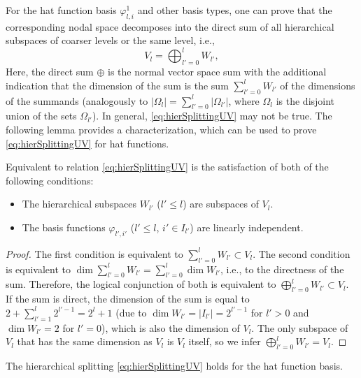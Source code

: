 %
For the hat function basis $\varphi_{l,i}^1$ and other basis types,
one can prove that the corresponding nodal space
decomposes into the direct sum of all
hierarchical subspaces of coarser levels or the same level, i.e.,
\begin{equation}
  \label{eq:hierSplittingUV}
  V_l
  = \bigoplus_{l'=0}^l W_{l'},
\end{equation}
Here, the direct sum $\oplus$ is
the normal vector space sum with the additional indication
that the dimension of the sum is the sum $\sum_{l'=0}^l W_{l'}$
of the dimensions of the summands
(analogously to $|\Omega_l| = \sum_{l'=0}^l |\Omega_{l'}|$,
where $\Omega_l$ is the disjoint union of the sets $\Omega_{l'}$).
In general, \eqref{eq:hierSplittingUV} may not be true.
The following lemma provides a characterization,
which can be used to prove \eqref{eq:hierSplittingUV} for hat functions.
\begin{lemma}
  \label{lemma:hierSplittingUV}
  Equivalent to relation \eqref{eq:hierSplittingUV} is the satisfaction of
  both of the following conditions:
  \begin{itemize}
    \item
    The hierarchical subspaces $W_{l'}$ ($l' \le l$) are subspaces of $V_l$.
    
    \item
    The basis functions $\varphi_{l',i'}$ ($l' \le l$, $i' \in I_{l'}$)
    are linearly independent.
  \end{itemize}
\end{lemma}
\begin{proof}
  The first condition is equivalent to $\sum_{l'=0}^l W_{l'} \subset V_l$.
  The second condition is equivalent to
  $\dim \sum_{l'=0}^l W_{l'} = \sum_{l'=0}^l \dim W_{l'}$,
  i.e., to the directness of the sum.
  Therefore, the logical conjunction of both is equivalent to
  $\bigoplus_{l'=0}^l W_{l'} \subset V_l$.
  If the sum is direct,
  the dimension of the sum is equal to $2 + \sum_{l'=1}^l 2^{l'-1} = 2^l + 1$
  (due to $\dim W_{l'} = |I_{l'}| = 2^{l'-1}$ for $l' > 0$ and
  $\dim W_{l'} = 2$ for $l' = 0$),
  which is also the dimension of $V_l$.
  The only subspace of $V_l$ that has the same dimension as $V_l$ is $V_l$ itself,
  so we infer $\bigoplus_{l'=0}^l W_{l'} = V_l$.
\end{proof}
\begin{corollary}
  The hierarchical splitting \eqref{eq:hierSplittingUV}
  holds for the hat function basis.
\end{corollary}
